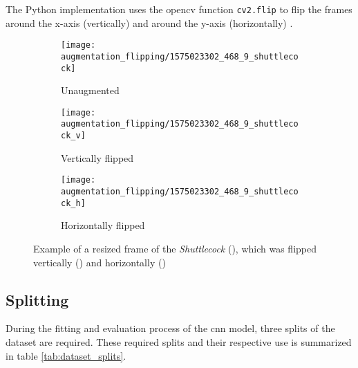 The Python implementation uses the \acrshort{opencv} function \texttt{cv2.flip} to flip the frames around the x-axis (vertically) and around the y-axis (horizontally) \cite{}. %

\begin{figure}
  \centering
  \begin{subfigure}[b]{0.3\textwidth}
    \centering
    \texttt{[image: augmentation\_flipping/1575023302\_468\_9\_shuttlecock]}
    \caption{Unaugmented}
    \label{subfig:af_resized}
  \end{subfigure}
  \begin{subfigure}[b]{0.3\textwidth}
    \centering
    \texttt{[image: augmentation\_flipping/1575023302\_468\_9\_shuttlecock\_v]}
    \caption{Vertically flipped}
    \label{subfig:af_vertical}
  \end{subfigure}
  \begin{subfigure}[b]{0.3\textwidth}
    \centering
    \texttt{[image: augmentation\_flipping/1575023302\_468\_9\_shuttlecock\_h]}
    \caption{Horizontally flipped}
    \label{subfig:af_horizontal}
  \end{subfigure}
  \caption{Example of a resized frame of the \textit{Shuttlecock} (), which was flipped vertically () and horizontally ()}
  \label{fig:augmentation_flipping}
\end{figure}










\subsection{Splitting}
\label{subsec:training_of_the_cnn:dataset:splitting}
During the fitting and evaluation process of the \acrshort{cnn} model, three splits of the dataset are required.
These required splits and their respective use is summarized in table \ref{tab:dataset_splits}.

